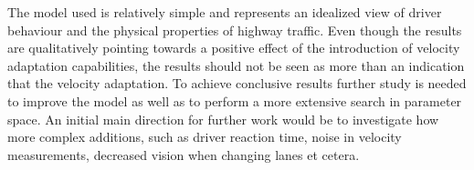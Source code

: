 \documentclass[11pt,a4paper,twocolumn]{article}
\begin{document}
The model used is relatively simple and represents an idealized view of driver behaviour and the physical properties of highway traffic. Even though the results are qualitatively pointing towards a positive effect of the introduction of velocity adaptation capabilities, the results should not be seen as more than an indication that the velocity adaptation. To achieve conclusive results further study is needed to improve the model as well as to perform a more extensive search in parameter space. An initial main direction for further work would be to investigate how more complex additions, such as driver reaction time, noise in velocity measurements, decreased vision when changing lanes et cetera.





\end{document}
